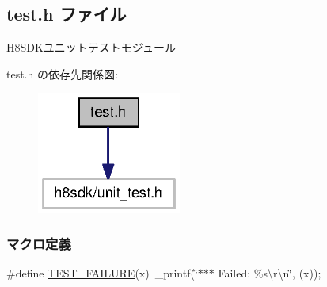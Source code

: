 \subsection{test.\+h ファイル}
\label{test_8h}


H8\+S\+D\+Kユニットテストモジュール  


test.\+h の依存先関係図\+:\nopagebreak
\begin{figure}[H]
\begin{center}
\leavevmode
\includegraphics[width=134pt]{test_8h__incl}
\end{center}
\end{figure}
\subsubsection*{マクロ定義}
\begin{DoxyCompactItemize}
\item 
\#define \hyperlink{test_8h_acefd270dacb1cf3685e5069fb5ea292c_acefd270dacb1cf3685e5069fb5ea292c}{T\+E\+S\+T\+\_\+\+F\+A\+I\+L\+U\+R\+E}(x)~\+\_\+printf(\char`\"{}$\ast$$\ast$$\ast$ Failed\+: \%s\textbackslash{}r\textbackslash{}n\char`\"{}, (x));
\end{DoxyCompactItemize}
